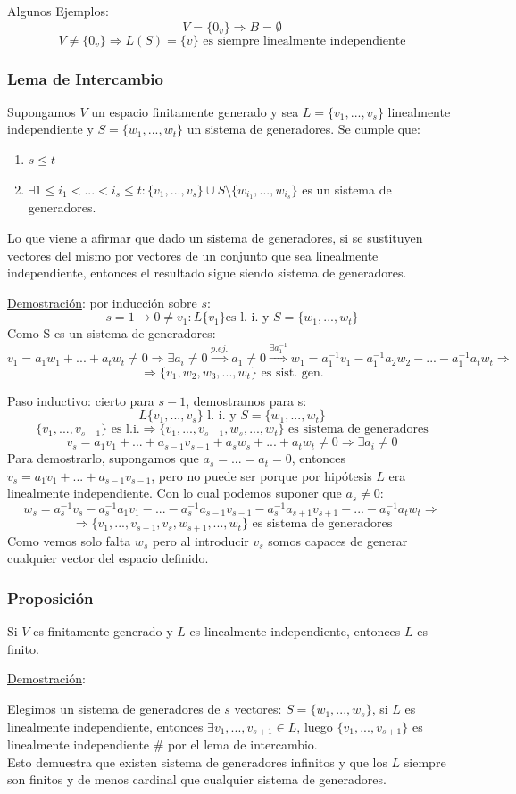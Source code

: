 \documentclass[10pt,a4paper,openright]{book}
\begin{document}
Algunos Ejemplos:
$$V=\{0_v\}\Rightarrow B=\emptyset$$
$$V\neq \{0_v\}\Rightarrow L(S)=\{v\}\mbox{ es siempre linealmente independiente}$$

\subsubsection*{Lema de Intercambio}
Supongamos $V$ un espacio finitamente generado y sea $L=\{v_1, ..., v_s\}$ linealmente independiente y $S=\{w_1, ..., w_t\}$ un sistema de generadores. Se cumple que:
\begin{enumerate}
\item $s\leq t$
\item $\exists 1\leq i_1<...< i_s\leq t: \{v_1, ..., v_s\}\cup S\mbox{\textbackslash}\{w_{i_1}, ..., w_{i_s}\}$ es un sistema de generadores.
\end{enumerate}
Lo que viene a afirmar que dado un sistema de generadores, si se sustituyen vectores del mismo por vectores de un conjunto que sea linealmente independiente, entonces el resultado sigue siendo sistema de generadores.

\underline{Demostración}: por inducción sobre $s$:
$$s=1\rightarrow 0\neq v_1: L\{v_1\}\mbox{es l. i. y }S=\{w_1, ..., w_t\}$$
Como S es un sistema de generadores:
$$v_1=a_1w_1+...+a_tw_t\neq 0\Rightarrow \exists a_i\neq 0\stackrel{p.ej.}{\Rightarrow} a_1\neq 0\stackrel{\exists a_1^{-1}}{\Rightarrow} w_1=a_1^{-1}v_1-a_1^{-1}a_2w_2-...- a_1^{-1}a_tw_t\Rightarrow $$
$$\Rightarrow \{v_1, w_2, w_3, ..., w_t\}\mbox{ es sist. gen.}$$

Paso inductivo: cierto para $s-1$, demostramos para s:
$$L\{v_1, ..., v_s\} \mbox{ l. i. y } S=\{w_1, ..., w_t\}$$
$$\{v_1, ..., v_{s-1}\}\mbox{ es l.i.}\Rightarrow \{v_1, ..., v_{s-1},w_s, ...,w_t\}\mbox{ es sistema de generadores}$$
$$v_s=a_1v_1+...+ a_{s-1}v_{s-1}+a_sw_s+...+a_tw_t\neq 0\Rightarrow \exists a_i\neq 0$$
Para demostrarlo, supongamos que $a_s=...=a_t=0$, entonces $v_s=a_1v_1+...+a_{s-1}v_{s-1}$, pero no puede ser porque por hipótesis $L$ era linealmente independiente. Con lo cual podemos suponer que $a_s\neq 0$:
$$w_s= a_s^{-1}v_s-a_s^{-1}a_1v_1-...-a_s^{-1}a_{s-1}v_{s-1}- a_s^{-1}a_{s+1}v_{s+1}-...- a_s^{-1}a_tw_t\Rightarrow$$
$$\Rightarrow \{v_1, ..., v_{s-1}, v_s, w_{s+1}, ..., w_t\}\mbox{ es sistema de generadores} $$
Como vemos solo falta $w_s$ pero al introducir $v_s$ somos capaces de generar cualquier vector del espacio definido.

\subsubsection*{Proposición}
Si $V$ es finitamente generado y $L$ es linealmente independiente, entonces $L$ es finito.\par
\underline{Demostración}:\par
Elegimos un sistema de generadores de $s$ vectores: $S=\{w_1, ..., w_s\}$, si $L$ es linealmente independiente, entonces $\exists v_1, ..., v_{s+1}\in L$, luego $\{v_1, ..., v_{s+1}\}$ es linealmente independiente \# por el lema de intercambio.
$$$$
Esto demuestra que existen sistema de generadores infinitos y que los $L$ siempre son finitos y de menos cardinal que cualquier sistema de generadores.
\end{document}
